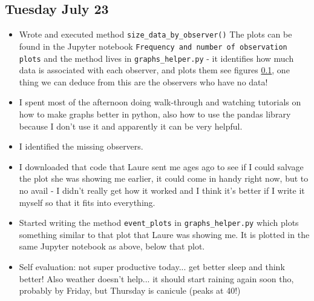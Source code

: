 \documentclass[12pt]{article}
\begin{document}
\subsection{Tuesday July 23}
\begin{itemize}
    \item Wrote and executed method \texttt{size\_data\_by\_observer()} The plots can be found in the Jupyter notebook \texttt{Frequency and number of observation plots} and the method lives in \texttt{graphs\_helper.py} - it identifies how much data is associated with each observer, and plots them see figures \ref{}, one thing we can deduce from this are the observers who have no data!
    \item I spent most of the afternoon doing walk-through and watching tutorials on how to make graphs better in python, also how to use the pandas library because I don't use it and apparently it can be very helpful.
    \item I identified the missing observers.
    \item I downloaded that code that Laure sent me ages ago to see if I could salvage the plot she was showing me earlier, it could come in handy right now, but to no avail - I didn't really get how it worked and I think it's better if I write it myself so that it fits into everything.
    \item Started writing the method \texttt{event\_plots} in \texttt{graphs\_helper.py} which plots something similar to that plot that Laure was showing me. It is plotted in the same Jupyter notebook as above, below that plot.
    \item Self evaluation: not super productive today... get better sleep and think better! Also weather doesn't help... it should start raining again soon tho, probably by Friday, but Thursday is canicule (peaks at 40!)
\end{itemize}
\end{document}
